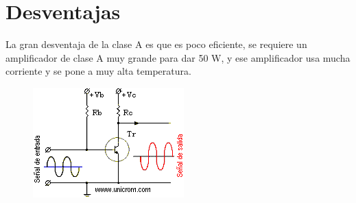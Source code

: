 \documentclass[12pt,a4paper]{article}
\begin{document}
\section{Desventajas}
La gran desventaja de la clase A es que es poco eficiente, se requiere un amplificador de clase A muy grande para dar 50 W, y ese amplificador usa mucha corriente y se pone a muy alta temperatura.
\begin{figure}[h!]
\centering
\includegraphics[scale=1]{images.png} 
\end{figure}\\
\end{document}
